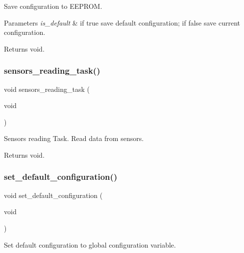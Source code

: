 Save configuration to E\+E\+P\+R\+OM. 


\begin{DoxyParams}{Parameters}
{\em is\+\_\+default} & if true save default configuration; if false save current configuration. \\
\hline
\end{DoxyParams}
\begin{DoxyReturn}{Returns}
void. 
\end{DoxyReturn}
\mbox{\label{rmap_8ino_ad3efe51e17cb8205a24267c2992a12d4}} 
\subsubsection{\texorpdfstring{sensors\+\_\+reading\+\_\+task()}{sensors\_reading\_task()}}
{\footnotesize\ttfamily void sensors\+\_\+reading\+\_\+task (\begin{DoxyParamCaption}\item[{void}]{ }\end{DoxyParamCaption})}



Sensors reading Task. Read data from sensors. 

\begin{DoxyReturn}{Returns}
void. 
\end{DoxyReturn}
\mbox{\label{rmap_8ino_a951e4934b8add405b8fe45417fc380f5}} 
\subsubsection{\texorpdfstring{set\+\_\+default\+\_\+configuration()}{set\_default\_configuration()}}
{\footnotesize\ttfamily void set\+\_\+default\+\_\+configuration (\begin{DoxyParamCaption}\item[{void}]{ }\end{DoxyParamCaption})}



Set default configuration to global configuration variable. 

